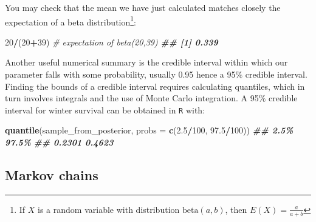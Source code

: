 \documentclass[
  12pt,
]{krantz}
\newenvironment{Shaded}{\begin{snugshade}}{\end{snugshade}}
\newcommand{\AttributeTok}[1]{\textcolor[rgb]{0.13,0.29,0.53}{#1}}
\newcommand{\CommentTok}[1]{\textcolor[rgb]{0.56,0.35,0.01}{\textit{#1}}}
\newcommand{\DecValTok}[1]{\textcolor[rgb]{0.00,0.00,0.81}{#1}}
\newcommand{\DocumentationTok}[1]{\textcolor[rgb]{0.56,0.35,0.01}{\textbf{\textit{#1}}}}
\newcommand{\FloatTok}[1]{\textcolor[rgb]{0.00,0.00,0.81}{#1}}
\newcommand{\FunctionTok}[1]{\textcolor[rgb]{0.13,0.29,0.53}{\textbf{#1}}}
\newcommand{\NormalTok}[1]{#1}
\newcommand{\SpecialCharTok}[1]{\textcolor[rgb]{0.81,0.36,0.00}{\textbf{#1}}}
\begin{document}
You may check that the mean we have just calculated matches closely the expectation of a beta distribution\footnote{If \(X\) is a random variable with distribution \(\text{beta}(a, b)\), then \(E(X) = \displaystyle{\frac{a}{a + b}}\)}:

\begin{Shaded}
\begin{Highlighting}[]
\DecValTok{20}\SpecialCharTok{/}\NormalTok{(}\DecValTok{20}\SpecialCharTok{+}\DecValTok{39}\NormalTok{) }\CommentTok{\# expectation of beta(20,39)}
\DocumentationTok{\#\# [1] 0.339}
\end{Highlighting}
\end{Shaded}

Another useful numerical summary is the credible interval within which our parameter falls with some probability, usually 0.95 hence a 95\(\%\) credible interval. Finding the bounds of a credible interval requires calculating quantiles, which in turn involves integrals and the use of Monte Carlo integration. A 95\(\%\) credible interval for winter survival can be obtained in \texttt{R} with:

\begin{Shaded}
\begin{Highlighting}[]
\FunctionTok{quantile}\NormalTok{(sample\_from\_posterior, }\AttributeTok{probs =} \FunctionTok{c}\NormalTok{(}\FloatTok{2.5}\SpecialCharTok{/}\DecValTok{100}\NormalTok{, }\FloatTok{97.5}\SpecialCharTok{/}\DecValTok{100}\NormalTok{))}
\DocumentationTok{\#\#   2.5\%  97.5\% }
\DocumentationTok{\#\# 0.2301 0.4623}
\end{Highlighting}
\end{Shaded}

\hypertarget{markovmodelmcmc}{%
\subsection{Markov chains}\label{markovmodelmcmc}}
\end{document}
